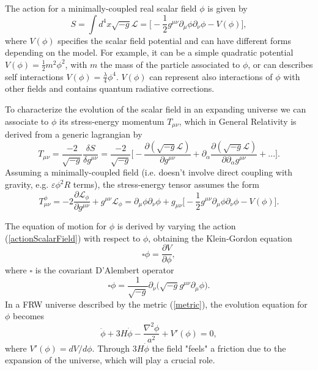 \documentclass[11pt,a4paper,twoside]{book}
\begin{document}
The action for a minimally-coupled real scalar field $ \phi $ is given by
\begin{equation}
	\label{actionScalarField}
	S=\int d^{4} x \sqrt{-g} \mathcal{L} = \Big [-\dfrac{1}{2} g^{\mu\nu} \partial_{\mu}\phi \partial_{\nu} \phi - V(\phi)\Big],	
\end{equation}
where $ V(\phi) $ specifies the scalar field potential and  can have different forms depending on the model. For example, it can be a simple quadratic potential $ V(\phi)=\frac{1}{2}m^{2}\phi^{2} $, with $ m $ the mass of the particle associated to $ \phi $,$  $ or can describes  self interactions $ V(\phi) = \frac{\lambda}{4} \phi^{4} $. $ V(\phi) $ can represent also interactions of $ \phi $ with other fields and contains quantum radiative corrections. 

To characterize the evolution of the scalar field in an expanding universe we can associate to $ \phi $ its stress-energy momentum $ T_{\mu\nu} $, which in General Relativity is derived from a generic lagrangian by
\begin{equation}
	\label{stressEnergyMomentum}
	T_{\mu\nu}= \frac{-2}{\sqrt{-g}}\frac{\delta S}{\delta g^{\mu\nu}}=
	\frac{-2}{\sqrt{-g}}\Big [-\frac{\partial (\sqrt{-g} \mathcal{L})}{\partial g^{\mu\nu}} + \partial _{\alpha} \frac{\partial (\sqrt{-g} \mathcal{L})}{\partial \partial_{\alpha} g^{\mu\nu}} + ... \Big ].
\end{equation}
Assuming a minimally-coupled field (i.e. doesn't involve direct coupling with gravity, e.g. $ \varepsilon  \phi^{2} R$ terms), the stress-energy tensor assumes the form
\begin{equation}
	\label{tensorScalrField2}
	T^{\phi}_{\mu\nu} = -2 \frac{\partial \mathcal{L}_{\phi}}{\partial g^{\mu\nu}} + g^{\mu\nu} \mathcal{L}_{\phi}
 =\partial_{\mu} \phi \partial_{\nu} \phi + g_{\mu\nu} \Big [-\frac{1}{2}g^{\mu\nu}\partial_{\mu}\phi\partial_{\nu}\phi - V(\phi)\Big].
\end{equation}

The equation of motion for $ \phi $ is derived by varying the action (\ref{actionScalarField}) with respect to $ \phi $, obtaining the Klein-Gordon equation
\begin{equation}
	\label{KGEquation}
	\square  \phi = \frac{\partial V}{\partial \phi},	
\end{equation}
where $\square$ is the covariant D'Alembert operator
\begin{equation}
	\label{alembertOperator}
	\square \phi = \frac{1}{\sqrt{-g}}\partial_{\nu}\Big (\sqrt{-g} g^{\mu\nu} \partial_{\mu}\phi\Big ).
\end{equation}
In a FRW universe described by the metric (\ref{metric}), the evolution equation for $ \phi $ becomes
\begin{equation}
	\label{eomForPhi}	
	\ddot{\phi} + 3H\dot{\phi} - \frac{\nabla^{2} \phi}{a^{2}} + V'(\phi)=0,
\end{equation}
where $ V'(\phi)=dV/d\phi $. Through $ 3H\dot{\phi} $ the field "feels" a friction due to the expansion of the universe, which will play a crucial role.
\end{document}
